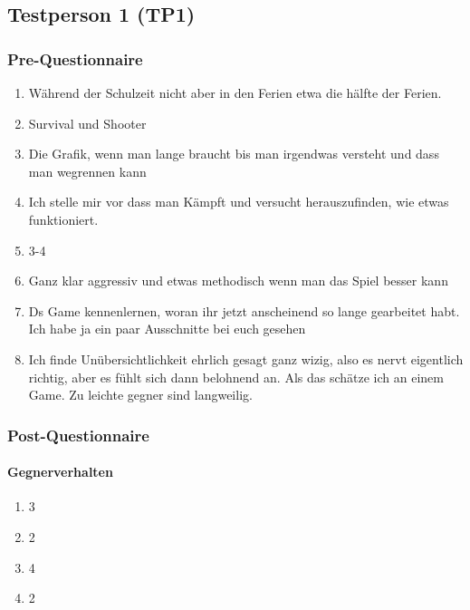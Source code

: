 \documentclass[../Main.tex]{subfiles}
\begin{document}
\subsection{Testperson 1 (TP1)}

\subsubsection{Pre-Questionnaire}

\begin{enumerate}[label=\textbf{P\arabic*}, leftmargin=1.5cm, itemsep=0.5em]
    \item Während der Schulzeit nicht aber in den Ferien etwa die hälfte der Ferien.
    \item Survival und Shooter
    \item Die Grafik, wenn man lange braucht bis man irgendwas versteht und dass man wegrennen kann
    \item Ich stelle mir vor dass man Kämpft und versucht herauszufinden, wie etwas funktioniert.
    \item 3-4
    \item Ganz klar aggressiv und etwas methodisch wenn man das Spiel besser kann
    \item Ds Game kennenlernen, woran ihr jetzt anscheinend so lange gearbeitet habt. Ich habe ja ein paar Ausschnitte bei euch gesehen
    \item Ich finde Unübersichtlichkeit ehrlich gesagt ganz wizig, also es nervt eigentlich richtig, aber es fühlt sich dann belohnend an. Als das schätze ich an einem Game. Zu leichte gegner sind langweilig.
\end{enumerate}

\subsubsection{Post-Questionnaire}

\paragraph{Gegnerverhalten}
\begin{enumerate}[label=\textbf{Q\arabic*}, leftmargin=1.5cm, itemsep=0.5em]
    \item 3
    \item 2
    \item 4
    \item 2
\end{enumerate}
\end{document}
